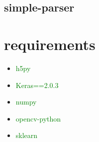 \documentclass[UTF8,a4paper,11pt]{ctexart}
\begin{document}
    \subsection{simple-parser}
\section{requirements}
        \begin{itemize}
            \item {\textcolor{green}{h5py}}
            \item {\textcolor{green}{Keras==2.0.3}}
            \item {\textcolor{green}{numpy}}
            \item {\textcolor{green}{opencv-python}}
            \item {\textcolor{green}{sklearn}}
        \end{itemize}
\end{document}
